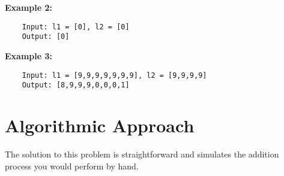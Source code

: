 \textbf{Example 2:}

\begin{verbatim}
    Input: l1 = [0], l2 = [0]
    Output: [0]
\end{verbatim}

\textbf{Example 3:}

\begin{verbatim}
    Input: l1 = [9,9,9,9,9,9,9], l2 = [9,9,9,9]
    Output: [8,9,9,9,0,0,0,1]
\end{verbatim}

\section*{Algorithmic Approach}
The solution to this problem is straightforward and simulates the addition process you would perform by hand.

